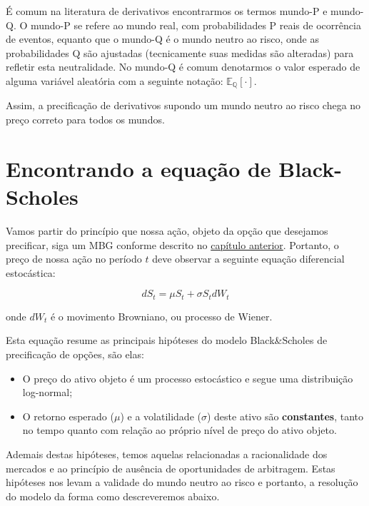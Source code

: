 \documentclass[]{book}
\providecommand{\tightlist}{%
  \setlength{\itemsep}{0pt}\setlength{\parskip}{0pt}}
\theoremstyle{definition}
\theoremstyle{definition}
\theoremstyle{definition}
\theoremstyle{remark}
\begin{document}
É comum na literatura de derivativos encontrarmos os termos mundo-P e mundo-Q. O mundo-P se refere ao mundo real, com probabilidades P reais de ocorrência de eventos, equanto que o mundo-Q é o mundo neutro ao risco, onde as probabilidades Q são ajustadas (tecnicamente suas medidas são alteradas) para refletir esta neutralidade. No mundo-Q é comum denotarmos o valor esperado de alguma variável aleatória com a seguinte notação: \(\mathbb{E_Q}[\cdot]\).

Assim, a precificação de derivativos supondo um mundo neutro ao risco chega no preço correto para todos os mundos.

\hypertarget{encontrando-a-equacao-de-black-scholes}{%
\section{Encontrando a equação de Black-Scholes}\label{encontrando-a-equacao-de-black-scholes}}

Vamos partir do princípio que nossa ação, objeto da opção que desejamos precificar, siga um MBG conforme descrito no \protect\hyperlink{processos-estocasticos}{capítulo anterior}. Portanto, o preço de nossa ação no período \(t\) deve observar a seguinte equação diferencial estocástica:

\begin{equation}
dS_t=\mu S_t+\sigma S_t dW_t 
\label{eq:ds}
\end{equation}

onde \(dW_t\) é o movimento Browniano, ou processo de Wiener.

Esta equação resume as principais hipóteses do modelo Black\&Scholes de precificação de opções, são elas:

\begin{itemize}
\tightlist
\item
  O preço do ativo objeto é um processo estocástico e segue uma distribuição log-normal;
\item
  O retorno esperado (\(\mu\)) e a volatilidade (\(\sigma\)) deste ativo são \textbf{constantes}, tanto no tempo quanto com relação ao próprio nível de preço do ativo objeto.
\end{itemize}

Ademais destas hipóteses, temos aquelas relacionadas a racionalidade dos mercados e ao princípio de ausência de oportunidades de arbitragem. Estas hipóteses nos levam a validade do mundo neutro ao risco e portanto, a resolução do modelo da forma como descreveremos abaixo.
\end{document}
